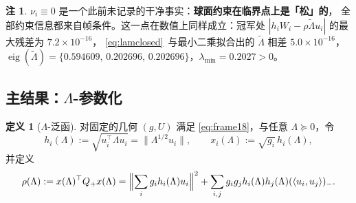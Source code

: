 \documentclass[UTF8,11pt]{ctexart}
\theoremstyle{definition}
\newtheorem{definition}[theorem]{定义}
\newtheorem{remark}[theorem]{注}
\newcommand{\Lam}{\Lambda}
\begin{document}
\begin{remark}\label{rmk:ukktread}
$\nu_i\equiv0$ 是一个此前未记录的干净事实：\textbf{球面约束在临界点上是「松」的}，
全部约束信息都来自帧条件。这一点在数值上同样成立：冠军处
$|h_iW_i-\rho\tilde\Lam u_i|$ 的最大残差为 $7.2\times10^{-16}$，
\eqref{eq:lamclosed}~与最小二乘拟合出的 $\tilde\Lam$ 相差 $5.0\times10^{-16}$，
$\operatorname{eig}(\tilde\Lam)=\{0.594609,\,0.202696,\,0.202696\}$，$\lambda_{\min}=0.2027>0$。
\end{remark}

\subsection{主结果：$\Lam$-参数化}\label{sec:r18:main}

\begin{definition}[$\Lam$-泛函]\label{def:lamfunc}
对固定的几何 $(g,U)$ 满足 \eqref{eq:frame18}，与任意 $\Lam\succeq0$，令
\begin{equation}\label{eq:hlam}
h_i(\Lam):=\sqrt{u_i^\top\Lam u_i}=\|\Lam^{1/2}u_i\|,\qquad
x_i(\Lam):=\sqrt{g_i}\,h_i(\Lambda),
\end{equation}
并定义
\begin{equation}\label{eq:rholam}
\rho(\Lam):=x(\Lam)^\top Q_+x(\Lam)
=\Bigl\|\sum_ig_ih_i(\Lam)u_i\Bigr\|^2+\sum_{i,j}g_ig_jh_i(\Lam)h_j(\Lam)(\langle u_i,u_j\rangle)_- .
\end{equation}
\end{definition}
\end{document}
